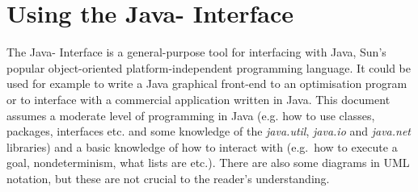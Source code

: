 %
% 
% 
% 
% 

\newcommand{\jarlocation}{{\tt /lib/eclipse.jar}}
\newcommand{\docslocation}{{\tt /doc/javadoc/JavaEclipseInterface/index.html}}
\newcommand{\exampleslocation}{{\tt /doc/examples/JavaInterface}}

%




\chapter{Using the Java-{\eclipse} Interface}
\label{chapjava}
The Java-{\eclipse} Interface is a general-purpose tool for
interfacing {\eclipse} with Java, Sun's popular object-oriented
platform-independent programming language. It could be used for
example to write a Java graphical front-end to an {\eclipse} optimisation
program or to interface {\eclipse} with a commercial application
written in Java. This document assumes a moderate level of programming
in Java (e.g. how to use classes, packages, interfaces etc. and some
knowledge of the {\it java.util}, {\it java.io} and {\it java.net}
libraries) and a basic knowledge of how to interact with {\eclipse}
(e.g.\ how to execute a goal, nondeterminism, what lists are
etc.). There are also some diagrams in UML notation, but these are not
crucial to the reader's understanding.

